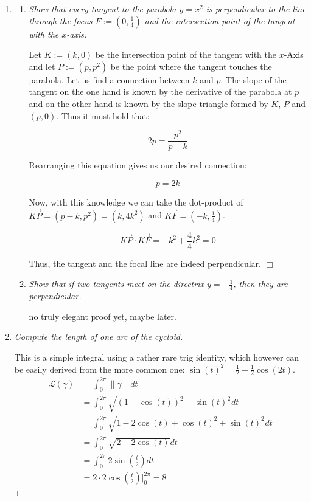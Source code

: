\documentclass[a4paper,11pt,notitlepage,fullpage]{paper}
\theoremstyle{plain}
\theoremstyle{definition}
\begin{document}
\begin{enumerate}

\item
\begin{enumerate}
\item \emph{Show that every tangent to the parabola $y=x^2$ is perpendicular to the line through the focus $F := (0, \frac{1}{4})$ and the intersection point of the tangent with the $x$-axis.}

Let $K := (k, 0)$ be the intersection point of the tangent with the $x$-Axis and let $P := (p, p^2)$ be the point where the  tangent touches the parabola. Let us find a connection between $k$ and $p$. The slope of the tangent on the one hand is known by the derivative of the parabola at $p$ and on the other hand is known by the slope triangle formed by $K$, $P$ and $(p,0)$. Thus it must hold that:

\begin{equation*}
2p = \frac{p^2}{p-k}
\end{equation*}

Rearranging this equation gives us our desired connection:

\begin{equation*}
p = 2k
\end{equation*}

Now, with this knowledge we can take the dot-product of $\overrightarrow{KP} = (p-k, p^2) = (k, 4k^2)$ and $\overrightarrow{KF} = (-k, \frac{1}{4})$.

\begin{equation*}
\overrightarrow{KP} \cdot \overrightarrow{KF} = -k^2 + \frac{4}{4}k^2 = 0
\end{equation*}

Thus, the tangent and the focal line are indeed perpendicular. \hfill $\Box$

\item \emph{Show that if two tangents meet on the directrix $y = -\frac{1}{4}$, then they are perpendicular.}

no truly elegant proof yet, maybe later.

\end{enumerate}

\item \emph{Compute the length of one arc of the cycloid.}

This is a simple integral using a rather rare trig identity, which however can be easily derived from the more common one: $\sin(t)^2 = \frac{1}{2} - \frac{1}{2}\cos(2t)$.
\begin{align*}
\mathcal L(\gamma) &= \int_0^{2\pi} \left\| \dot\gamma \right\| dt \\
&= \int_0^{2\pi} \sqrt{(1-\cos(t))^2 + \sin(t)^2} dt \\
&= \int_0^{2\pi} \sqrt{1 - 2\cos(t) + \cos(t)^2 + \sin(t)^2} dt \\
&= \int_0^{2\pi} \sqrt{2 - 2\cos(t)} dt \\
&= \int_0^{2\pi} 2 \sin\left(\frac{t}{2}\right) dt \\
&= 2 \cdot 2 \cos\left(\frac{t}{2}\right)\Bigg|_0^{2\pi} = 8
\end{align*}
\hfill $\Box$


\end{enumerate}
\end{document}
